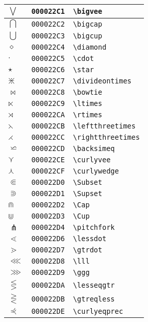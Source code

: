 \begin{longtable}{|l|l|l|}
\hline
$\bigvee$ & \texttt{000022C1} & \verb|\bigvee| \\
\hline
$\bigcap$ & \texttt{000022C2} & \verb|\bigcap| \\
\hline
$\bigcup$ & \texttt{000022C3} & \verb|\bigcup| \\
\hline
$\diamond$ & \texttt{000022C4} & \verb|\diamond| \\
\hline
$\cdot$ & \texttt{000022C5} & \verb|\cdot| \\
\hline
$\star$ & \texttt{000022C6} & \verb|\star| \\
\hline
$\divideontimes$ & \texttt{000022C7} & \verb|\divideontimes| \\
\hline
$\bowtie$ & \texttt{000022C8} & \verb|\bowtie| \\
\hline
$\ltimes$ & \texttt{000022C9} & \verb|\ltimes| \\
\hline
$\rtimes$ & \texttt{000022CA} & \verb|\rtimes| \\
\hline
$\leftthreetimes$ & \texttt{000022CB} & \verb|\leftthreetimes| \\
\hline
$\rightthreetimes$ & \texttt{000022CC} & \verb|\rightthreetimes| \\
\hline
$\backsimeq$ & \texttt{000022CD} & \verb|\backsimeq| \\
\hline
$\curlyvee$ & \texttt{000022CE} & \verb|\curlyvee| \\
\hline
$\curlywedge$ & \texttt{000022CF} & \verb|\curlywedge| \\
\hline
$\Subset$ & \texttt{000022D0} & \verb|\Subset| \\
\hline
$\Supset$ & \texttt{000022D1} & \verb|\Supset| \\
\hline
$\Cap$ & \texttt{000022D2} & \verb|\Cap| \\
\hline
$\Cup$ & \texttt{000022D3} & \verb|\Cup| \\
\hline
$\pitchfork$ & \texttt{000022D4} & \verb|\pitchfork| \\
\hline
$\lessdot$ & \texttt{000022D6} & \verb|\lessdot| \\
\hline
$\gtrdot$ & \texttt{000022D7} & \verb|\gtrdot| \\
\hline
$\lll$ & \texttt{000022D8} & \verb|\lll| \\
\hline
$\ggg$ & \texttt{000022D9} & \verb|\ggg| \\
\hline
$\lesseqgtr$ & \texttt{000022DA} & \verb|\lesseqgtr| \\
\hline
$\gtreqless$ & \texttt{000022DB} & \verb|\gtreqless| \\
\hline
$\curlyeqprec$ & \texttt{000022DE} & \verb|\curlyeqprec| \\

\end{longtable}
